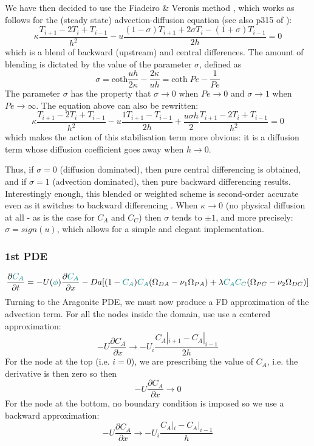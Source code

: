 \documentclass[a4paper]{article}
\begin{document}
We have then decided to use the 
Fiadeiro \& Veronis method \cite{five77,wrig92}, which works as follows for the (steady state)
advection-diffusion equation (see also p315 of \cite{boudreau}):
\[
\kappa \frac{T_{i+1}-2T_i + T_{i-1}}{h^2}
- u \frac{(1-\sigma) T_{i+1}+2\sigma T_i -(1+\sigma)T_{i-1}}{2 h} = 0
\]
which is a blend of backward (upstream) and central differences. The amount of
blending is dictated by the value of the parameter $\sigma$, defined as
\[
\sigma 
= \text{coth} \frac{u h}{2 \kappa} - \frac{2 \kappa}{u h}
= \text{coth} \; Pe  - \frac{1}{Pe}
\]
The parameter $\sigma$ has the property that
$\sigma \rightarrow 0$ when $Pe \rightarrow 0$ and 
$\sigma \rightarrow 1$ when $Pe \rightarrow \infty$.
The equation above can also be rewritten:
\[
\kappa \frac{T_{i+1}-2T_i + T_{i-1}}{h^2}
- u \frac{1 T_{i+1}-T_{i-1}}{2 h} 
+ \frac{u \sigma h}{2} \frac{T_{i+1}-2 T_i +T_{i-1}}{h^2} = 0
\]
which makes the action of this stabilisation term more obvious: it is a diffusion term whose 
diffusion coefficient goes away when $h\rightarrow 0$. 

Thus, if $\sigma = 0$ (diffusion dominated), then pure central differencing is obtained, and if
$\sigma = 1$ (advection dominated), then pure backward differencing results. Interestingly
enough, this blended or weighted scheme is second-order accurate even as it switches
to backward differencing \cite{five77}. 
When $\kappa \rightarrow 0$ (no physical diffusion at all - as is the case for $C_A$ and $C_C$)
then $\sigma$ tends to $\pm 1$, and more precisely: $\sigma = sign(u)$, which allows for a simple 
and elegant implementation. 


\subsubsection*{1st PDE}

\[
\frac{\partial {\color{teal} C_A}}{\partial t} 
= -U({\color{teal}\phi}) \frac{\partial {\color{teal}C_A}}{\partial x} 
- Da[(1-{\color{teal}C_A}){\color{teal}C_A}(\Omega_{DA}-\nu_1\Omega_{PA})+
\lambda {\color{teal}C_AC_C} (\Omega_{PC}-\nu_2\Omega_{DC})]
\]
Turning to the Aragonite PDE, we must now produce a FD approximation of the advection term.
For all the nodes inside the domain, use use a centered approximation:
\[
-U \frac{\partial C_A}{\partial x} \rightarrow -U_i \frac{C_A|_{i+1} -C_A|_{i-1}}{2h}
\]
For the node at the top (i.e. $i=0$), we are prescribing the value of $C_A$, i.e.
the derivative is then zero so then 
\[
-U \frac{\partial C_A}{\partial x} \rightarrow 0 
\]
For the node at the bottom, no boundary condition is imposed so we use a backward
approximation:
\[
-U \frac{\partial C_A}{\partial x} \rightarrow -U_i \frac{C_A|_{i} -C_A|_{i-1}}{h}
\]
 
\end{document}
